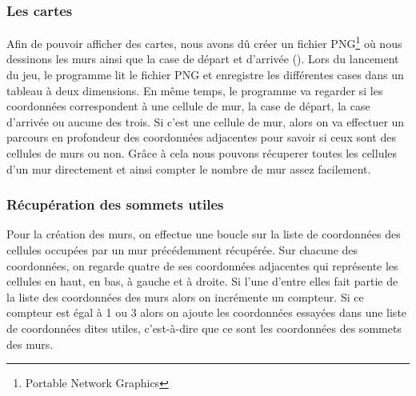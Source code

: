 \documentclass[11pt]{article}
\begin{document}

\subsubsection{Les cartes}
Afin de pouvoir afficher des cartes, nous avons dû créer un fichier PNG\footnote{Portable Network Graphics} où nous dessinons les murs ainsi que la case de départ et d'arrivée (). Lors du lancement du jeu, le programme lit le fichier PNG et enregistre les différentes cases dans un tableau à deux dimensions. En même temps, le programme va regarder si les coordonnées correspondent à une cellule de mur, la case de départ, la case d'arrivée ou aucune des trois. Si c'est une cellule de mur, alors on va effectuer un parcours en profondeur des coordonnées adjacentes pour savoir si ceux sont des cellules de murs ou non. Grâce à cela nous pouvons récuperer toutes les cellules d'un mur directement et ainsi compter le nombre de mur assez facilement.


\subsubsection{Récupération des sommets utiles}
Pour la création des murs, on effectue une boucle sur la liste de coordonnées des cellules occupées par un mur précédemment récupérée. Sur chacune des coordonnées, on regarde quatre de ses coordonnées adjacentes qui représente les cellules en haut, en bas, à gauche et à droite. Si l'une d'entre elles fait partie de la liste des coordonnées des murs alors on incrémente un compteur. Si ce compteur est égal à 1 ou 3 alors on ajoute les coordonnées essayées dans une liste de coordonnées dites utiles, c'est-à-dire que ce sont les coordonnées des sommets des murs.
\end{document}
